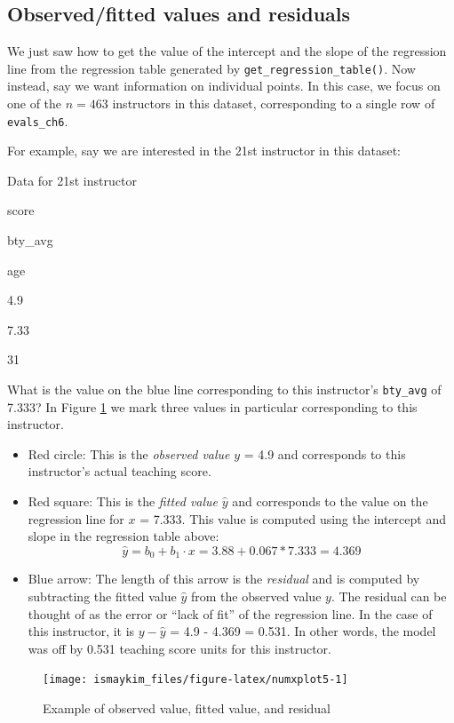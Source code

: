 \documentclass[12pt,]{krantz}
\providecommand{\tightlist}{%
  \setlength{\itemsep}{0pt}\setlength{\parskip}{0pt}}
\begin{document}
\subsection{Observed/fitted values and residuals}\label{model1points}

We just saw how to get the value of the intercept and the slope of the
regression line from the regression table generated by
\texttt{get\_regression\_table()}. Now instead, say we want information
on individual points. In this case, we focus on one of the \(n = 463\)
instructors in this dataset, corresponding to a single row of
\texttt{evals\_ch6}.

For example, say we are interested in the 21st instructor in this
dataset:

\label{tab:unnamed-chunk-179}Data for 21st instructor

score

bty\_avg

age

4.9

7.33

31

What is the value on the blue line corresponding to this instructor's
\texttt{bty\_avg} of 7.333? In Figure \ref{fig:numxplot5} we mark three
values in particular corresponding to this instructor.

\begin{itemize}
\tightlist
\item
  Red circle: This is the \emph{observed value} \(y\) = 4.9 and
  corresponds to this instructor's actual teaching score.
\item
  Red square: This is the \emph{fitted value} \(\widehat{y}\) and
  corresponds to the value on the regression line for \(x\) = 7.333.
  This value is computed using the intercept and slope in the regression
  table above:
  \[\widehat{y} = b_0 + b_1 \cdot x = 3.88 + 0.067 * 7.333 = 4.369\]
\item
  Blue arrow: The length of this arrow is the \emph{residual} and is
  computed by subtracting the fitted value \(\widehat{y}\) from the
  observed value \(y\). The residual can be thought of as the error or
  ``lack of fit'' of the regression line. In the case of this
  instructor, it is \(y - \widehat{y}\) = 4.9 - 4.369 = 0.531. In other
  words, the model was off by 0.531 teaching score units for this
  instructor.
\end{itemize}

\begin{figure}

{\centering \texttt{[image: ismaykim\_files/figure-latex/numxplot5-1]} 

}

\caption{Example of observed value, fitted value, and residual}\label{fig:numxplot5}
\end{figure}
\end{document}
